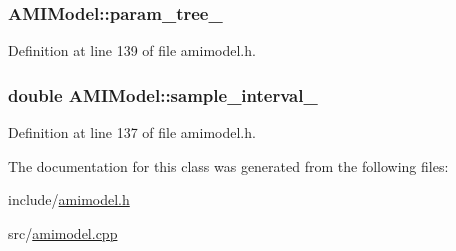 \subsubsection[{param\+\_\+tree\+\_\+}]{ A\+M\+I\+Model\+::param\+\_\+tree\+\_\+\hspace{0.3cm}{\ttfamily [protected]}}\label{class_a_m_i_model_a4da53456e13a1224f2bb47396ab0ecbd}


Definition at line 139 of file amimodel.\+h.

\hypertarget{class_a_m_i_model_a4d4c286b04668c22f2e3f315715a6d5b}{}
\subsubsection[{sample\+\_\+interval\+\_\+}]{\setlength{\rightskip}{0pt plus 5cm}double A\+M\+I\+Model\+::sample\+\_\+interval\+\_\+\hspace{0.3cm}{\ttfamily [protected]}}\label{class_a_m_i_model_a4d4c286b04668c22f2e3f315715a6d5b}


Definition at line 137 of file amimodel.\+h.



The documentation for this class was generated from the following files\+:\begin{DoxyCompactItemize}
\item 
include/\hyperlink{amimodel_8h}{amimodel.\+h}\item 
src/\hyperlink{amimodel_8cpp}{amimodel.\+cpp}\end{DoxyCompactItemize}
